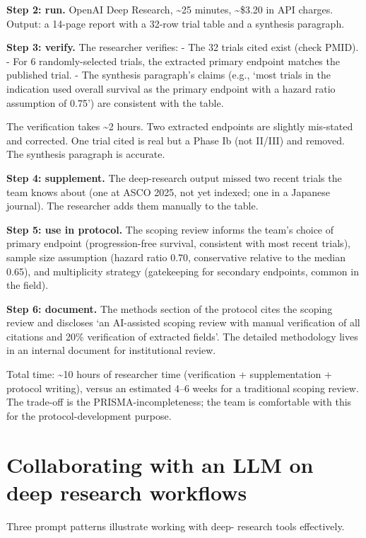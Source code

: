 \documentclass[
  letterpaper,
  11pt]{scrbook}
\begin{document}
\textbf{Step 2: run.} OpenAI Deep Research, \textasciitilde25 minutes,
\textasciitilde\$3.20 in API charges. Output: a 14-page report with a
32-row trial table and a synthesis paragraph.

\textbf{Step 3: verify.} The researcher verifies: - The 32 trials cited
exist (check PMID). - For 6 randomly-selected trials, the extracted
primary endpoint matches the published trial. - The synthesis
paragraph's claims (e.g., `most trials in the indication used overall
survival as the primary endpoint with a hazard ratio assumption of
0.75') are consistent with the table.

The verification takes \textasciitilde2 hours. Two extracted endpoints
are slightly mis-stated and corrected. One trial cited is real but a
Phase Ib (not II/III) and removed. The synthesis paragraph is accurate.

\textbf{Step 4: supplement.} The deep-research output missed two recent
trials the team knows about (one at ASCO 2025, not yet indexed; one in a
Japanese journal). The researcher adds them manually to the table.

\textbf{Step 5: use in protocol.} The scoping review informs the team's
choice of primary endpoint (progression-free survival, consistent with
most recent trials), sample size assumption (hazard ratio 0.70,
conservative relative to the median 0.65), and multiplicity strategy
(gatekeeping for secondary endpoints, common in the field).

\textbf{Step 6: document.} The methods section of the protocol cites the
scoping review and discloses `an AI-assisted scoping review with manual
verification of all citations and 20\% verification of extracted
fields'. The detailed methodology lives in an internal document for
institutional review.

Total time: \textasciitilde10 hours of researcher time (verification +
supplementation + protocol writing), versus an estimated 4--6 weeks for
a traditional scoping review. The trade-off is the
PRISMA-incompleteness; the team is comfortable with this for the
protocol-development purpose.

\section{Collaborating with an LLM on deep research
workflows}\label{collaborating-with-an-llm-on-deep-research-workflows}

Three prompt patterns illustrate working with deep- research tools
effectively.
\end{document}
